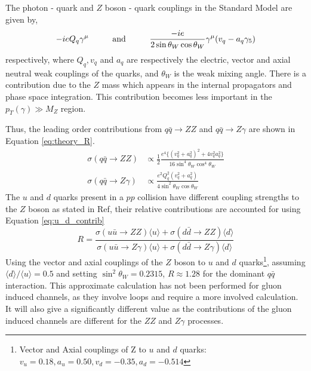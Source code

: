 \documentclass[11pt,a4paper,openright,twoside]{report}
\begin{document}
The photon - quark and $Z$ boson - quark couplings in the Standard Model are given by,
\begin{equation}
	-ieQ_q\gamma^{\mu} \hspace{1 cm} \text{and} \hspace{1 cm}\frac{-ie}{2 \sin\theta_W \cos\theta_W}\gamma^{\mu}(v_q - a_q\gamma_5)
\end{equation}
respectively, where $Q_q,v_q$ and $a_q$ are respectively the electric, vector and axial neutral weak couplings of the quarks, and $\theta_W$ is the weak mixing angle. There is a contribution due to the $Z$ mass which appears in the internal propagators and phase space integration. This contribution becomes less important in the $p_T(\gamma)\gg M_Z$ region.

Thus, the leading order contributions from $q\bar{q}\rightarrow ZZ$ and $q\bar{q}\rightarrow Z\gamma$ are shown in Equation \ref{eq:theory_R}.
\begin{equation}
\begin{split}
	\sigma(q\bar{q}\rightarrow ZZ) &\propto \frac{1}{2}\frac{e^4\{(v_q^2 + a_q^2)^2 + 4v_q^2a_q^2\} }{16\sin^4\theta_W\cos^4\theta_W}\\[1.5ex]
	\sigma(q\bar{q}\rightarrow Z\gamma) &\propto \frac{e^2Q_q^2(v^2_q + a^2_q)}{4\sin^2\theta_W\cos\theta_W}
\end{split}
\label{eq:theory_R}
\end{equation}
The $u$ and $d$ quarks present in a $pp$ collision have different coupling strengths to the $Z$ boson as stated in Ref\cite{Z_coupling}, their relative contributions are accounted for using Equation \ref{eq:u_d_contrib}
\begin{equation}
R = \frac{\sigma(u\bar{u}\rightarrow ZZ)\langle u\rangle + \sigma(d\bar{d}\rightarrow ZZ)\langle d\rangle}{\sigma(u\bar{u}\rightarrow Z\gamma)\langle u\rangle + \sigma(d\bar{d}\rightarrow Z\gamma)\langle d\rangle}
\label{eq:u_d_contrib}
\end{equation}
Using the vector and axial couplings of the $Z$ boson to $u$ and $d$ quarks\footnote{Vector and Axial couplings of Z to $u$ and $d$ quarks: $v_u = 0.18, a_u = 0.50, v_d = -0.35, a_d = -0.514$}, assuming $\langle d \rangle/\langle u\rangle = 0.5$ and setting $\sin^2\theta_W = 0.2315$, $R\approx 1.28$ for the dominant $q\bar{q}$ interaction. This approximate calculation has not been performed for gluon induced channels, as they involve loops and require a more involved calculation. It will also give a significantly different value as the contributions of the gluon induced channels are different for the $ZZ$ and $Z\gamma$ processes.
\end{document}
